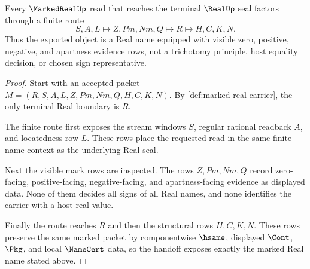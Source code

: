 \begin{theorem}
\label{thm:marked-real-real-seal-handoff}
Every $\MarkedRealUp$ read that reaches the terminal $\RealUp$ seal factors through a finite route
$$
S,A,L \longmapsto Z,Pm,Nm,Q \longmapsto R \longmapsto H,C,K,N .
$$
Thus the exported object is a Real name equipped with visible zero, positive, negative, and apartness evidence rows, not a trichotomy principle, host equality decision, or chosen sign representative.
\end{theorem}
\begin{proof}
Start with an accepted packet $M=(R,S,A,L,Z,Pm,Nm,Q,H,C,K,N)$. By \autoref{def:marked-real-carrier}, the only terminal Real boundary is $R$.

The finite route first exposes the stream windows $S$, regular rational readback $A$, and locatedness row $L$. These rows place the requested read in the same finite name context as the underlying Real seal.

Next the visible mark rows are inspected. The rows $Z,Pm,Nm,Q$ record zero-facing, positive-facing, negative-facing, and apartness-facing evidence as displayed data. None of them decides all signs of all Real names, and none identifies the carrier with a host real value.

Finally the route reaches $R$ and then the structural rows $H,C,K,N$. These rows preserve the same marked packet by componentwise $\hsame$, displayed $\Cont$, $\Pkg$, and local $\NameCert$ data, so the handoff exposes exactly the marked Real name stated above.
\end{proof}




